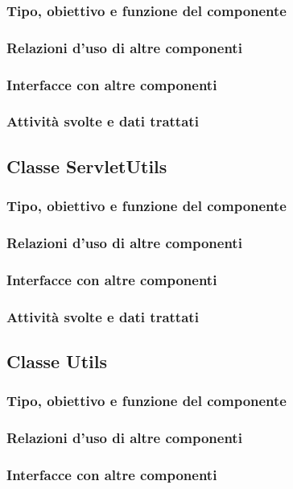 \subsubsection*{Tipo, obiettivo e funzione del componente}
\subsubsection*{Relazioni d'uso di altre componenti}
\subsubsection*{Interfacce con altre componenti}
\subsubsection*{Attivit\`a svolte e dati trattati}

\subsection{Classe ServletUtils}
\subsubsection*{Tipo, obiettivo e funzione del componente}
\subsubsection*{Relazioni d'uso di altre componenti}
\subsubsection*{Interfacce con altre componenti}
\subsubsection*{Attivit\`a svolte e dati trattati}

\subsection{Classe Utils}
\subsubsection*{Tipo, obiettivo e funzione del componente}
\subsubsection*{Relazioni d'uso di altre componenti}
\subsubsection*{Interfacce con altre componenti}
